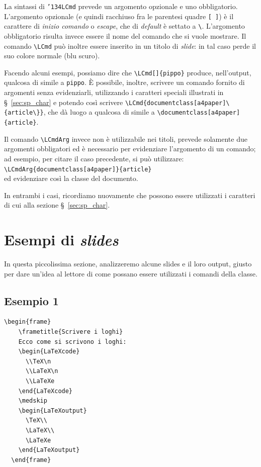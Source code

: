 \documentclass[a4paper,10pt]{article}
\newcommand{\bs}{{\char'134}}%
\newcommand{\cmd}[1]{\texttt{\bs #1}}
\begin{document}
La sintassi di \cmd{LCmd} prevede un argomento opzionale e uno
obbligatorio. L'argomento opzionale (e quindi racchiuso fra le
parentesi quadre \verb+[ ]+) è il carattere di \emph{inizio comando} o
\textit{escape}, che di \textit{default} è settato a \verb+\+.
L'argomento obbligatorio risulta invece essere il nome del comando che
si vuole mostrare. Il comando \verb+\LCmd+ può inoltre essere inserito
in un titolo di \textit{slide}: in tal caso perde il suo colore
normale (blu scuro).

Facendo alcuni esempi, possiamo dire che \verb+\LCmd[]{pippo}+
produce, nell'output, qualcosa di simile a \texttt{pippo}. \`E
possibile, inoltre, scrivere un comando fornito di argomenti senza
evidenziarli, utilizzando i caratteri speciali illustrati in
\S~\ref{sec:sp_char} e potendo così scrivere
\verb+\LCmd{documentclass[a4paper]\{article\}}+, che dà luogo a
qualcosa di simile a \verb+\documentclass[a4paper]{article}+.

Il comando \verb+\LCmdArg+ invece non è utilizzabile nei titoli,
prevede solamente due argomenti obbligatori ed è
necessario per evidenziare l'argomento di un comando; ad esempio, per
citare il caso precedente, si può utilizzare:\\[.5em]
\verb+\LCmdArg{documentclass[a4paper]}{article}+\\[.5em] ed
evidenziare così la classe del documento.

In entrambi i casi, ricordiamo nuovamente che possono essere
utilizzati i caratteri di cui alla sezione \S~\ref{sec:sp_char}.


\newpage
\section{Esempi di \textit{slides}}
In questa piccolissima sezione, analizzeremo alcune slides e il loro
output, giusto per dare un'idea al lettore di come possano essere
utilizzati i comandi della classe.

\subsection*{Esempio 1}\label{ex1}

\begin{Verbatim}[gobble=2]
  \begin{frame}
    \frametitle{Scrivere i loghi}
    Ecco come si scrivono i loghi:
    \begin{LaTeXcode}
      \\TeX\n
      \\LaTeX\n
      \\LaTeXe
    \end{LaTeXcode}
    \medskip
    \begin{LaTeXoutput}
      \TeX\\
      \LaTeX\\
      \LaTeXe
    \end{LaTeXoutput}
  \end{frame}
\end{Verbatim}
\end{document}
